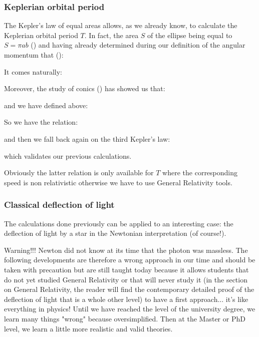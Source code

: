 	\pagebreak
	\subsubsection{Keplerian orbital period}
	The Kepler's law of equal areas allows, as we already know, to calculate the Keplerian orbital period $T$. In fact, the area $S$ of the ellipse being equal to $S=\pi a b$ () and having already determined during our definition of the angular momentum that ():
	 
	It comes naturally:
	
	Moreover, the study of conics () has showed us that:
	
	and we have defined above:
	
	So we have the relation:
	
	and then we fall back again on the third Kepler's law:
	
	which validates our previous calculations.
	
	Obviously the latter relation is only available for $T$ where the corresponding speed is non relativistic otherwise we have to use General Relativity tools.

	\pagebreak
	\subsubsection{Classical deflection of light}\label{classical deflection of light}
	The calculations done previously can be applied to an interesting case: the deflection of light by a star in the Newtonian interpretation (of course!).

	Warning!!! Newton did not know at its time that the photon was massless. The following developments are therefore a wrong approach in our time and should be taken with precaution but are still taught today because it allows students that do not yet studied General Relativity or that will never study it  (in the section on General Relativity, the reader will find the contemporary detailed proof of the deflection of light that is a whole other level) to have a first approach... it's like everything in physics! Until we have reached the level of the university degree, we learn many things "wrong" because oversimplified. Then at the Master or PhD level, we learn a little more realistic and valid theories.

